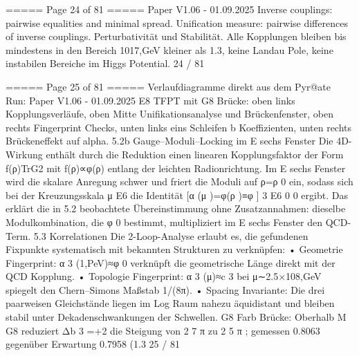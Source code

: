 \begin{MyVerbatim}
===== Page 24 of 81 =====
Paper V1.06 - 01.09.2025
Inverse couplings: pairwise equalities and minimal spread.
Unification measure: pairwise differences of inverse couplings.
Perturbativität und Stabilität.
Alle Kopplungen bleiben bis mindestens in den Bereich 1017,GeV kleiner als 1.3, keine Landau Pole, keine instabilen
Bereiche im Higgs Potential.
24 / 81

===== Page 25 of 81 =====
Verlaufdiagramme direkt aus dem Pyr@ate Run:
Paper V1.06 - 01.09.2025
E8 TFPT mit G8 Brücke: oben links Kopplungsverläufe, oben Mitte Unifikationsanalyse und Brückenfenster, oben rechts
Fingerprint Checks, unten links eins Schleifen b Koeffizienten, unten rechts Brückeneffekt auf alpha.
5.2b Gauge–Moduli–Locking im E sechs Fenster
Die 4D-Wirkung enthält durch die Reduktion einen linearen Kopplungsfaktor der Form f(ρ)TrG2 mit f(ρ)∝φ(ρ) entlang
der leichten Radionrichtung. Im E sechs Fenster wird die skalare Anregung schwer und friert die Moduli auf ρ=ρ 0 ein,
sodass sich bei der Kreuzungsskala μ E6 die Identität
[α (μ )=φ(ρ )≡φ ]
3 E6 0 0
ergibt. Das erklärt die in 5.2 beobachtete Übereinstimmung ohne Zusatzannahmen: dieselbe Modulkombination, die φ 0
bestimmt, multipliziert im E sechs Fenster den QCD-Term.
5.3 Korrelationen
Die 2-Loop-Analyse erlaubt es, die gefundenen Fixpunkte systematisch mit bekannten Strukturen zu verknüpfen:
• Geometrie Fingerprint: α 3 (1,PeV)≈φ 0 verknüpft die geometrische Länge direkt mit der QCD Kopplung.
• Topologie Fingerprint: α 3 (μ)≈c 3 bei μ∼2.5×108,GeV spiegelt den Chern–Simons Maßstab 1/(8π).
• Spacing Invariante: Die drei paarweisen Gleichstände liegen im Log Raum nahezu äquidistant und bleiben stabil unter
Dekadenschwankungen der Schwellen.
G8 Farb Brücke: Oberhalb M G8 reduziert Δb 3 =+2 die Steigung von 2 7 π zu 2 5 π ; gemessen 0.8063 gegenüber Erwartung
0.7958 (1.3%
25 / 81


\end{MyVerbatim}
